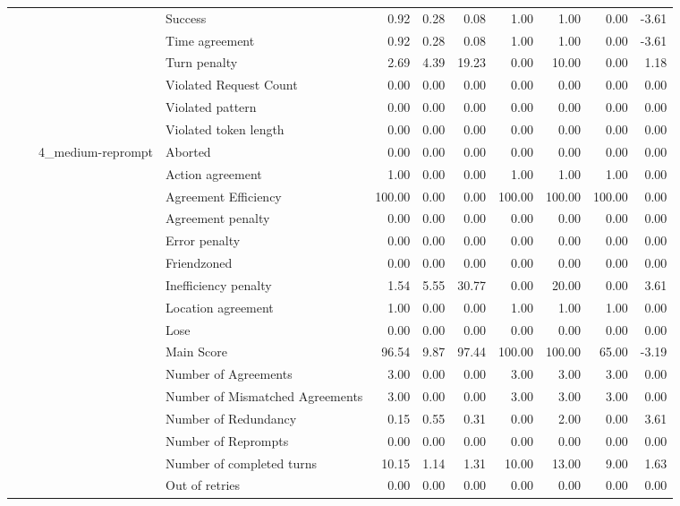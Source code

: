 \begin{tabular}{llllrrrrrrr}
 &  &  & Success & 0.92 & 0.28 & 0.08 & 1.00 & 1.00 & 0.00 & -3.61 \\
 &  &  & Time agreement & 0.92 & 0.28 & 0.08 & 1.00 & 1.00 & 0.00 & -3.61 \\
 &  &  & Turn penalty & 2.69 & 4.39 & 19.23 & 0.00 & 10.00 & 0.00 & 1.18 \\
 &  &  & Violated Request Count & 0.00 & 0.00 & 0.00 & 0.00 & 0.00 & 0.00 & 0.00 \\
 &  &  & Violated pattern & 0.00 & 0.00 & 0.00 & 0.00 & 0.00 & 0.00 & 0.00 \\
 &  &  & Violated token length & 0.00 & 0.00 & 0.00 & 0.00 & 0.00 & 0.00 & 0.00 \\
\cline{3-11}
 &  & \multirow[t]{27}{*}{4_medium-reprompt} & Aborted & 0.00 & 0.00 & 0.00 & 0.00 & 0.00 & 0.00 & 0.00 \\
 &  &  & Action agreement & 1.00 & 0.00 & 0.00 & 1.00 & 1.00 & 1.00 & 0.00 \\
 &  &  & Agreement Efficiency & 100.00 & 0.00 & 0.00 & 100.00 & 100.00 & 100.00 & 0.00 \\
 &  &  & Agreement penalty & 0.00 & 0.00 & 0.00 & 0.00 & 0.00 & 0.00 & 0.00 \\
 &  &  & Error penalty & 0.00 & 0.00 & 0.00 & 0.00 & 0.00 & 0.00 & 0.00 \\
 &  &  & Friendzoned & 0.00 & 0.00 & 0.00 & 0.00 & 0.00 & 0.00 & 0.00 \\
 &  &  & Inefficiency penalty & 1.54 & 5.55 & 30.77 & 0.00 & 20.00 & 0.00 & 3.61 \\
 &  &  & Location agreement & 1.00 & 0.00 & 0.00 & 1.00 & 1.00 & 1.00 & 0.00 \\
 &  &  & Lose & 0.00 & 0.00 & 0.00 & 0.00 & 0.00 & 0.00 & 0.00 \\
 &  &  & Main Score & 96.54 & 9.87 & 97.44 & 100.00 & 100.00 & 65.00 & -3.19 \\
 &  &  & Number of Agreements & 3.00 & 0.00 & 0.00 & 3.00 & 3.00 & 3.00 & 0.00 \\
 &  &  & Number of Mismatched Agreements & 3.00 & 0.00 & 0.00 & 3.00 & 3.00 & 3.00 & 0.00 \\
 &  &  & Number of Redundancy & 0.15 & 0.55 & 0.31 & 0.00 & 2.00 & 0.00 & 3.61 \\
 &  &  & Number of Reprompts & 0.00 & 0.00 & 0.00 & 0.00 & 0.00 & 0.00 & 0.00 \\
 &  &  & Number of completed turns & 10.15 & 1.14 & 1.31 & 10.00 & 13.00 & 9.00 & 1.63 \\
 &  &  & Out of retries & 0.00 & 0.00 & 0.00 & 0.00 & 0.00 & 0.00 & 0.00 \\

\end{tabular}

